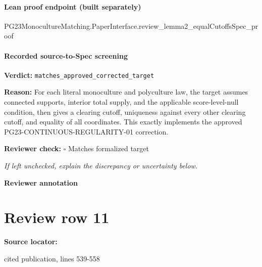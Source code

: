 \documentclass[10pt]{article}
\newcommand{\reviewerbox}{%
  \par\noindent\fbox{\parbox{0.96\linewidth}{\rule{0pt}{0.38in}}}\par
}
\newcommand{\reviewmatch}[1]{%
  \par\noindent\textbf{Reviewer check:} $\square$\; #1\par
  \noindent\emph{If left unchecked, explain the discrepancy or uncertainty below.}\par
}
\begin{document}
\paragraph{Lean proof endpoint (built separately)}\begin{ReviewVerbatim}
PG23MonocultureMatching.PaperInterface.review_lemma2_equalCutoffsSpec_proof
\end{ReviewVerbatim}

\paragraph{Recorded source-to-Spec screening}
\textbf{Verdict:} \texttt{matches\_approved\_corrected\_target}
\\
{\raggedright
\textbf{Reason:} For each literal monoculture and polyculture law, the target assumes connected supports, interior total supply, and the applicable score-\allowbreak{}level-\allowbreak{}null condition, then gives a clearing cutoff, uniqueness against every other clearing cutoff, and equality of all coordinates.\allowbreak{} This exactly implements the approved PG23-\allowbreak{}CONTINUOUS-\allowbreak{}REGULARITY-\allowbreak{}01 correction.\allowbreak{}
\par}
\reviewmatch{Matches formalized target}
\noindent\textbf{Reviewer annotation}\par
\reviewerbox
\clearpage
\hypertarget{source-claim-f5675acd1426707d}{}
\section*{Review row 11}
\textbf{Source locator:} {\footnotesize\raggedright cited publication, lines 539-\allowbreak{}558\par}
\end{document}
